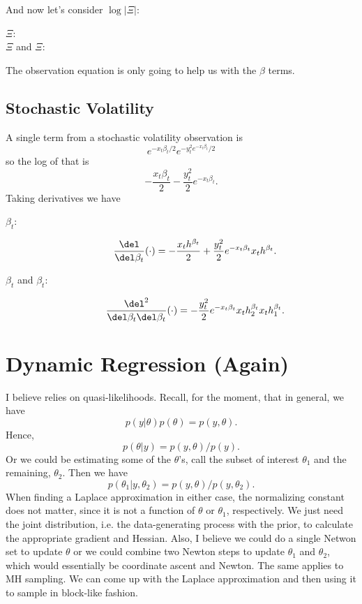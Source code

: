\documentclass{article}
\begin{document}
And now let's consider $\log |\Xi|$:
\begin{description}

\item[$\Xi$:]

\item[$\Xi$ and $\Xi$:]

\end{description}

The observation equation is only going to help us with the $\beta$ terms.

\subsection{Stochastic Volatility}

A single term from a stochastic volatility observation is
\[
e^{-x_t \beta_t/2} e^{-y_t^2 e^{-x_t \beta_t} / 2}
\]
so the log of that is
\[
- \frac{x_t \beta_t}{2} - \frac{y_t^2}{2} e^{-x_t \beta_t}.
\]
Taking derivatives we have
\begin{description}

\item[$\beta_t$:] \hfill
\[
\frac{\del}{\del \beta_{t}}(\cdot) = - \frac{x_t h^{\beta_t}}{2} 
+ \frac{y_t^2}{2} e^{-x_t \beta_t} x_t h^{\beta_t}.
\]

\item[$\beta_t$ and $\beta_t$:]
\[
\frac{\del^2}{\del \beta_t \del \beta_{t}}(\cdot) = 
-\frac{y_t^2}{2} e^{-x_t \beta_t} x_t h^{\beta_t}_2 x_t h^{\beta_t}_1.
\]

\end{description}

\section{Dynamic Regression (Again)}

I believe \cite{shephard-pitt-1997} relies on quasi-likelihoods.  Recall, for
the moment, that in general, we have
\[
p(y|\theta) p(\theta) = p(y,\theta).
\]
Hence, 
\[
p(\theta | y) = p(y,\theta) / p(y).
\]
Or we could be estimating some of the $\theta$'s, call the subset of interest
$\theta_1$ and the remaining, $\theta_2$.  Then we have
\[
p(\theta_1 | y, \theta_2) = p(y,\theta) / p(y, \theta_2).
\]
When finding a Laplace approximation in either case, the normalizing constant
does not matter, since it is not a function of $\theta$ or $\theta_1$,
respectively.  We just need the joint distribution, i.e. the data-generating
process with the prior, to calculate the appropriate gradient and Hessian.
Also, I believe we could do a single Netwon set to update $\theta$ or we could
combine two Newton steps to update $\theta_1$ and $\theta_2$, which would
essentially be coordinate ascent and Newton.  The same applies to MH sampling.
We can come up with the Laplace approximation and then using it to sample in
block-like fashion.
\end{document}
